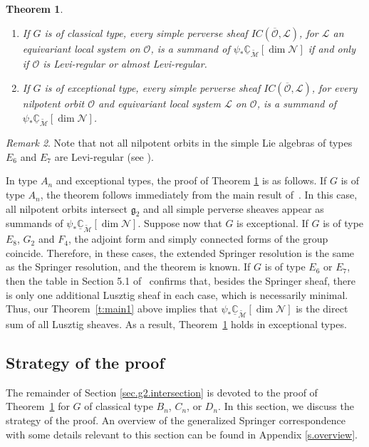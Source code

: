 \documentclass[reqno,11pt]{amsart}
\newtheorem{Thm}{Theorem}[section]
\theoremstyle{remark}
\newtheorem{Rem}[Thm]{Remark}
\theoremstyle{remark}
\theoremstyle{definition}
\theoremstyle{definition}
\theoremstyle{definition}
\numberwithin{equation}{section}
\newcommand{\C}{\mathbb{C}}           %
\newcommand{\fg}{{\mathfrak g}}
\newcommand{\cl}{\mathcal{L}}
\newcommand{\cm}{\mathcal{M}}
\newcommand{\cn}{\mathcal{N}}
\newcommand{\co}{\mathcal{O}}
\newcommand{\shc}{\underline{\C}}
\renewcommand{\tilde}{\widetilde}
\begin{document}
\begin{Thm} \label{thm.support} 
\begin{enumerate}
\item If $G$ is of classical type, every simple perverse sheaf $IC(\overline{\co}, \cl)$, for $\cl$ an equivariant local system on $\co$, is a summand of $\psi_*\shc_{\tilde{\cm}}[\dim \cn]$ if and only if $\co$ is Levi-regular or almost Levi-regular. 
\item If $G$ is of exceptional type, every simple perverse sheaf $IC(\overline{\co},\cl)$, for every nilpotent orbit $\co$ and equivariant local system $\cl$ on $\co$, is a summand of $\psi_*\shc_{\tilde{\cm}}[\dim \cn]$. 
\end{enumerate}
\end{Thm}

\begin{Rem}
Note that not all nilpotent orbits in the simple Lie algebras of types $E_6$ and $E_7$ are Levi-regular
(see \cite[Tables 2-4]{Russell}). 
\end{Rem}



In type $A_n$ and exceptional types, the proof of Theorem \ref{thm.support} is as follows.
If $G$ is of type $A_n$, the theorem follows immediately from the main result of~\cite{GPR23}.  In this case, all nilpotent orbits intersect $\fg_2$ and all simple perverse sheaves appear as summands of $\psi_*\shc_{\tilde{\cm}}[\dim \cn]$.  
Suppose now that $G$ is exceptional.  If $G$ is of type $E_8$, $G_2$ and $F_4$, the adjoint form and simply connected forms of the group coincide.  Therefore, in these cases, the extended Springer resolution is the same as the Springer resolution, and the theorem is known.
If $G$ is of type $E_6$ or $E_7$, then the table in Section 5.1 of~\cite{Spaltenstein1985} confirms that, besides the Springer sheaf, there is only one additional Lusztig sheaf in each case, which is necessarily minimal. Thus, our Theorem~\ref{t:main1} above implies that $\psi_*\shc_{\tilde{\cm}}[\dim \cn]$  is the direct sum of all Lusztig sheaves.  As a result, Theorem~\ref{thm.support}
 holds in exceptional types.  





\subsection{Strategy of the proof} \label{ss.strategy}
The remainder of Section \ref{sec.g2.intersection} is devoted to the proof of Theorem~\ref{thm.support} for $G$ of classical type $B_n$, $C_n$, or $D_n$.  In this section, we discuss the strategy of the proof.  An overview of the generalized Springer correspondence with
some details relevant to this section can be found in Appendix \ref{s.overview}.
\end{document}
